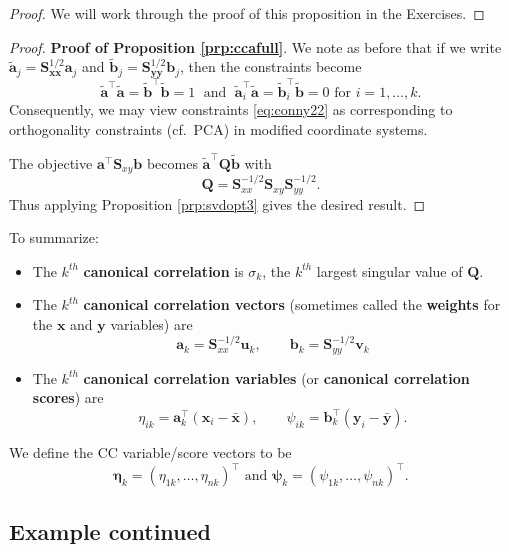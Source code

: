 \documentclass[
]{book}
\theoremstyle{definition}
\theoremstyle{definition}
\theoremstyle{definition}
\theoremstyle{definition}
\theoremstyle{remark}
\begin{document}
\begin{proof}
We will work through the proof of this proposition in the Exercises.
\end{proof}

\begin{proof}
\textbf{Proof of Proposition \ref{prp:ccafull}}. We note as before that if we write \(\tilde{\mathbf a}_j =\mathbf S_{\mathbf x\mathbf x}^{1/2} \mathbf a_j\) and \(\tilde{\mathbf b}_j=\mathbf S_{\mathbf y\mathbf y}^{1/2} \mathbf b_j\), then the constraints become
\[\tilde{\mathbf a}^\top \tilde{\mathbf a}=\tilde{\mathbf b}^\top\tilde{ \mathbf b}=1 \;\mbox{ and }\;\tilde{\mathbf a}_i^\top \tilde{\mathbf a}=\tilde{\mathbf b}_i^\top \tilde{\mathbf b} = 0 \mbox{ for }i=1, \ldots, k.
\]
Consequently, we may view constraints \eqref{eq:conny22} as corresponding to orthogonality constraints (cf.~PCA) in modified coordinate systems.

The objective \(\mathbf a^\top \mathbf S_{xy}\mathbf b\) becomes
\(\tilde{\mathbf a}^\top \mathbf Q\tilde{\mathbf b}\)
with
\[\mathbf Q= \mathbf S_{xx}^{-1/2} \mathbf S_{xy}\mathbf S_{yy}^{-1/2}.\]
Thus applying Proposition \ref{prp:svdopt3} gives the desired result.
\end{proof}

To summarize:

\begin{itemize}
\item
  The \(k^{th}\) \textbf{canonical correlation} is \(\sigma_k\), the \(k^{th}\) largest singular value of \(\mathbf Q\).
\item
  The \(k^{th}\) \textbf{canonical correlation vectors} (sometimes called the \textbf{weights} for the \(\mathbf x\) and \(\mathbf y\) variables) are \[\mathbf a_k = \mathbf S_{xx}^{-1/2} \mathbf u_k, \qquad \mathbf b_k = \mathbf S_{yy}^{-1/2} \mathbf v_k\]
\item
  The \(k^{th}\) \textbf{canonical correlation variables} (or \textbf{canonical correlation scores}) are
  \[\eta_{ik} = \mathbf a_k^\top (\mathbf x_i-\bar{\mathbf x}), \qquad \psi_{ik} = \mathbf b_k^\top (\mathbf y_i-\bar{\mathbf y}).\]
\end{itemize}

We define the CC variable/score vectors to be
\[{\pmb \eta}_k=(\eta_{1k}, \ldots , \eta_{nk})^\top \mbox{ and }{\pmb \psi}_{k}=(\psi_{1k}, \ldots , \psi_{nk})^\top.\]

\subsection{Example continued}\label{example-continued}
\end{document}

